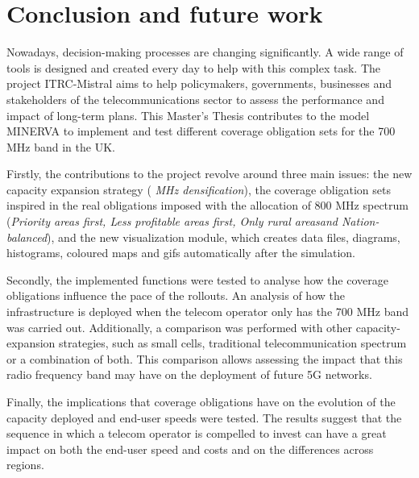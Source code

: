 \chapter{Conclusion and future work}


Nowadays, decision-making processes are changing significantly. A wide range of tools is designed and created every day to help with this complex task. The project ITRC-Mistral aims to help policymakers, governments, businesses and stakeholders of the telecommunications sector to assess the performance and impact of long-term plans. This Master’s Thesis contributes to the model MINERVA to implement and test different coverage obligation sets for the 700 MHz band in the UK. \par

Firstly, the contributions to the project revolve around three main issues: the new capacity expansion strategy (\textit{ MHz densification\guillemotright }), the coverage obligation sets inspired in the real obligations imposed with the allocation of 800 MHz spectrum (\guillemotleft \textit{Priority areas first\guillemotright , \guillemotleft Less profitable areas first\guillemotright , \guillemotleft Only rural areas\guillemotright  and \guillemotleft Nation-balanced\guillemotright }), and the new visualization module, which creates data files, diagrams, histograms, coloured maps and gifs automatically after the simulation.\par

Secondly, the implemented functions were tested to analyse how the coverage obligations influence the pace of the rollouts. An analysis of how the infrastructure is deployed when the telecom operator only has the 700 MHz band was carried out. Additionally, a comparison was performed with other capacity-expansion strategies, such as small cells, traditional telecommunication spectrum or a combination of both. This comparison allows assessing the impact that this radio frequency band may have on the deployment of future 5G networks.\par

Finally, the implications that coverage obligations have on the evolution of the capacity deployed and end-user speeds were tested. The results suggest that the sequence in which a telecom operator is compelled to invest can have a great impact on both the end-user speed and costs and on the differences across regions.\par




